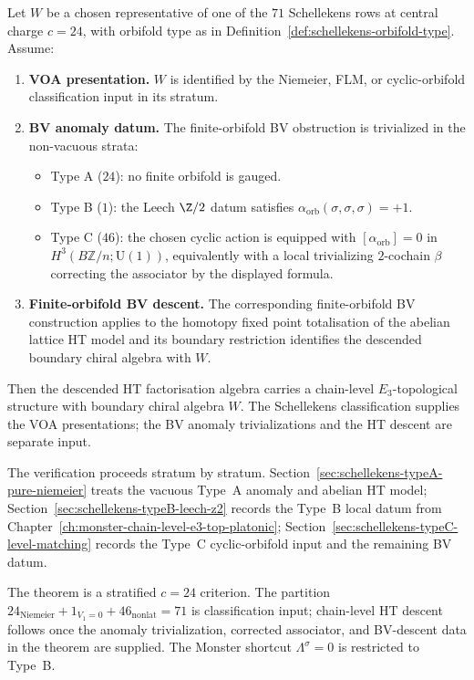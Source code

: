 \begin{theorem}
\label{thm:schellekens-71-all-alpha-zero}
Let $W$ be a chosen representative of one of the $71$ Schellekens rows
at central charge $c = 24$, with orbifold type as in
Definition~\ref{def:schellekens-orbifold-type}. Assume:
\begin{enumerate}[label=\textup{(\roman*)}]
\item \textbf{VOA presentation.} $W$ is identified by the Niemeier,
FLM, or cyclic-orbifold classification input in its stratum.
\item \textbf{BV anomaly datum.} The finite-orbifold BV obstruction is
trivialized in the non-vacuous strata:
 \begin{itemize}
 \item Type A ($24$): no finite orbifold is gauged.
 \item Type B ($1$): the Leech $\Z/2$ datum satisfies
 $\alpha_{\mathrm{orb}}(\sigma,\sigma,\sigma)=+1$.
 \item Type C ($46$): the chosen cyclic action is equipped with
 $[\alpha_{\mathrm{orb}}]=0$ in
 $H^3(B\mathbb{Z}/n;\mathrm{U}(1))$, equivalently with a local
 trivializing $2$-cochain $\beta$ correcting the associator by the
 displayed formula.
 \end{itemize}
\item \textbf{Finite-orbifold BV descent.} The corresponding
finite-orbifold BV construction applies to the homotopy fixed point
totalisation of the abelian lattice HT model and its boundary
restriction identifies the descended boundary chiral algebra with $W$.
\end{enumerate}
Then the descended HT factorisation algebra carries a chain-level
$E_3$-topological structure with boundary chiral algebra $W$. The
Schellekens classification supplies the VOA presentations; the BV
anomaly trivializations and the HT descent are separate input.
\end{theorem}

The verification proceeds stratum by stratum.
Section~\ref{sec:schellekens-typeA-pure-niemeier} treats the vacuous
Type~A anomaly and abelian HT model;
Section~\ref{sec:schellekens-typeB-leech-z2} records the Type~B local
datum from Chapter~\ref*{ch:monster-chain-level-e3-top-platonic};
Section~\ref{sec:schellekens-typeC-level-matching} records the Type~C
cyclic-orbifold input and the remaining BV datum.

\begin{remark}
\label{rem:schellekens-stratified-scope}
The theorem is a stratified $c=24$ criterion. The partition
$24_{\mathrm{Niemeier}} + 1_{V_1=0} + 46_{\mathrm{nonlat}} = 71$ is
classification input; chain-level HT descent follows once
the anomaly trivialization, corrected associator, and BV-descent data
in the theorem are supplied. The
Monster shortcut $\Lambda^\sigma = 0$ is restricted to Type~B.
\end{remark}

